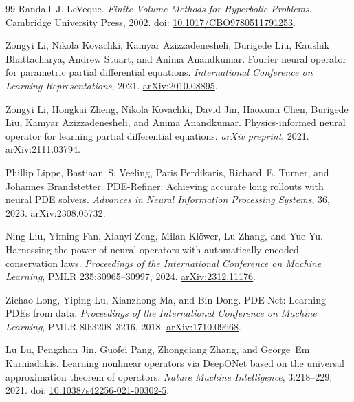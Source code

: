 \begin{thebibliography}{99}
Randall~J. LeVeque.
\emph{Finite Volume Methods for Hyperbolic Problems}.
Cambridge University Press, 2002. doi: \href{https://doi.org/10.1017/CBO9780511791253}{10.1017/CBO9780511791253}.

Zongyi Li, Nikola Kovachki, Kamyar Azizzadenesheli, Burigede Liu,
Kaushik Bhattacharya, Andrew Stuart, and Anima Anandkumar.
Fourier neural operator for parametric partial differential equations.
\emph{International Conference on Learning Representations}, 2021.
\href{https://arxiv.org/abs/2010.08895}{arXiv:2010.08895}.

Zongyi Li, Hongkai Zheng, Nikola Kovachki, David Jin, Haoxuan Chen,
Burigede Liu, Kamyar Azizzadenesheli, and Anima Anandkumar.
Physics-informed neural operator for learning partial differential equations.
\emph{arXiv preprint}, 2021. \href{https://arxiv.org/abs/2111.03794}{arXiv:2111.03794}.

Phillip Lippe, Bastiaan~S. Veeling, Paris Perdikaris, Richard~E. Turner,
and Johannes Brandstetter.
PDE-Refiner: Achieving accurate long rollouts with neural PDE solvers.
\emph{Advances in Neural Information Processing Systems}, 36, 2023.
\href{https://arxiv.org/abs/2308.05732}{arXiv:2308.05732}.

Ning Liu, Yiming Fan, Xianyi Zeng, Milan Kl\"ower, Lu Zhang, and Yue Yu.
Harnessing the power of neural operators with automatically encoded conservation laws.
\emph{Proceedings of the International Conference on Machine Learning},
PMLR 235:30965--30997, 2024. \href{https://arxiv.org/abs/2312.11176}{arXiv:2312.11176}.

Zichao Long, Yiping Lu, Xianzhong Ma, and Bin Dong.
PDE-Net: Learning PDEs from data.
\emph{Proceedings of the International Conference on Machine Learning},
PMLR 80:3208--3216, 2018. \href{https://arxiv.org/abs/1710.09668}{arXiv:1710.09668}.

Lu Lu, Pengzhan Jin, Guofei Pang, Zhongqiang Zhang, and George~Em Karniadakis.
Learning nonlinear operators via DeepONet based on the universal approximation
theorem of operators.
\emph{Nature Machine Intelligence}, 3:218--229, 2021.
doi: \href{https://doi.org/10.1038/s42256-021-00302-5}{10.1038/s42256-021-00302-5}.


\end{thebibliography}
